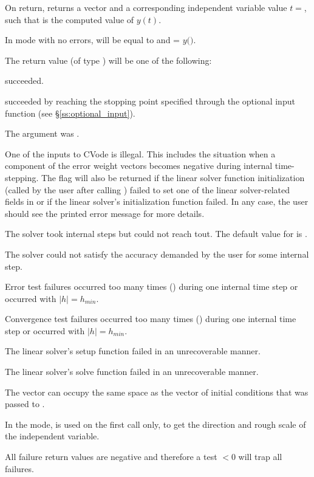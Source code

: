 {
  On return,  returns a vector  and a corresponding 
  independent variable value $t=$, such that  is the computed 
  value of $y(t)$.

  In  mode with no errors,  will be equal to  
  and  = $y($$)$.

  The return value  (of type ) will be one of the following:
  \begin{args}
  \item[\Id{SUCCESS}]
     succeeded.
  \item[\Id{TSTOP\_RETURN}]
     succeeded by reaching the stopping point specified through
    the optional input function  (see \S\ref{ss:optional_input}).
  \item[\Id{CVODE\_NO\_MEM}]
    The  argument was .
  \item[\Id{ILL\_INPUT}]
    One of the inputs to CVode is illegal. This includes the situation when a 
    component of the error weight vectors becomes negative during internal 
    time-stepping. The  flag will also be returned if the linear 
    solver function initialization (called by the user after calling 
    ) failed to set one of the linear solver-related fields 
    in  or if the linear solver's initialization function failed. 
    In any case, the user should see the printed error message for more details.
  \item[\Id{TOO\_MUCH\_WORK}] 
    The solver took  internal steps but could not reach tout. 
    The default value for  is .
  \item[\Id{TOO\_MUCH\_ACC}] 
    The solver could not satisfy the accuracy demanded by the user for some 
    internal step.
  \item[\Id{ERR\_FAILURE}]
    Error test failures occurred too many times () during one 
    internal time step or occurred with $|h| = h_{min}$.
  \item[\Id{CONV\_FAILURE}] 
    Convergence test failures occurred too many times () during 
    one internal time step or occurred with $|h| = h_{min}$.             
  \item[\Id{SETUP\_FAILURE}] 
    The linear solver's setup function failed in an unrecoverable manner.
  \item[\Id{SOLVE\_FAILURE}] 
    The linear solver's solve function failed in an unrecoverable manner.
  \end{args} 
}
{
  The vector  can occupy the same space as the  vector of 
  initial conditions that was passed to . 

  In the  mode,  is used on the first call only, 
  to get the direction and rough scale of the independent variable.

  All failure return values are negative and therefore a test $< 0$
  will trap all  failures.
}

